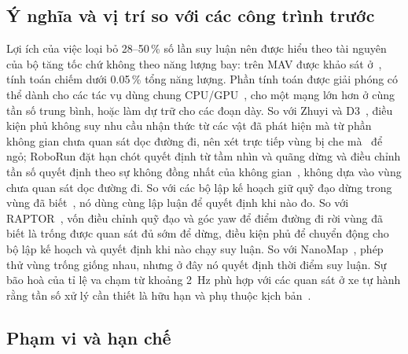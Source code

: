\documentclass[11pt,a4paper]{article}
\theoremstyle{plain}
\theoremstyle{definition}
\theoremstyle{remark}
\begin{document}
\subsection{Ý nghĩa và vị trí so với các công trình trước}

Lợi ích của việc loại bỏ 28--50\,\% số lần suy luận nên được hiểu theo tài nguyên của bộ tăng tốc chứ không theo năng lượng bay: trên MAV được khảo sát ở~\cite{boroujerdian2021}, tính toán chiếm dưới 0.05\,\% tổng năng lượng. Phần tính toán được giải phóng có thể dành cho các tác vụ dùng chung CPU/GPU~\cite{wofk2019}, cho một mạng lớn hơn ở cùng tần số trung bình, hoặc làm dự trữ cho các đoạn dày. So với Zhuyi và D3~\cite{hsiao2022,gog2022}, điều kiện phủ không suy nhu cầu nhận thức từ các vật đã phát hiện mà từ phần không gian chưa quan sát dọc đường đi, nên xét trực tiếp vùng bị che mà~\cite{hsiao2022} để ngỏ; RoboRun đặt hạn chót quyết định từ tầm nhìn và quãng dừng và điều chỉnh tần số quyết định theo sự không đồng nhất của không gian~\cite{boroujerdian2021}, không dựa vào vùng chưa quan sát dọc đường đi. So với các bộ lập kế hoạch giữ quỹ đạo dừng trong vùng đã biết~\cite{liu2016,tordesillas2021}, nó dùng cùng lập luận để quyết định khi nào đo. So với RAPTOR~\cite{zhou2021}, vốn điều chỉnh quỹ đạo và góc yaw để điểm đường đi rời vùng đã biết là trống được quan sát đủ sớm để dừng, điều kiện phủ để chuyển động cho bộ lập kế hoạch và quyết định khi nào chạy suy luận. So với NanoMap~\cite{florence2018}, phép thử vùng trống giống nhau, nhưng ở đây nó quyết định thời điểm suy luận. Sự bão hoà của tỉ lệ va chạm từ khoảng 2~Hz phù hợp với các quan sát ở xe tự hành rằng tần số xử lý cần thiết là hữu hạn và phụ thuộc kịch bản~\cite{zhao2021,hsiao2022}.

\subsection{Phạm vi và hạn chế}
\end{document}
